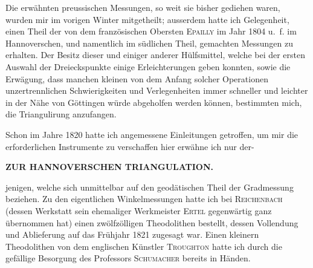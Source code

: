 \par\noindent\hspace*{\parindent}Die erwähnten preussischen Messungen, so weit sie bisher gediehen waren,
wurden mir im vorigen Winter mitgetheilt; ausserdem hatte ich Gelegenheit,
einen Theil der von dem französischen Obersten \textsc{Epailly} im Jahr 1804 u.\ f.
im Hannoverschen, und namentlich im südlichen Theil, gemachten Messungen
zu erhalten. Der Besitz dieser und einiger anderer Hülfsmittel, welche bei
der ersten Auswahl der Dreieckspunkte einige Erleichterungen geben konnten,
sowie die Erwägung, dass manchen kleinen von dem Anfang solcher Operationen
unzertrennlichen Schwierigkeiten und Verlegenheiten immer schneller
und leichter in der Nähe von Göttingen würde abgeholfen werden können,
bestimmten mich, die Triangulirung  anzufangen.

\par\noindent\hspace*{\parindent}Schon im Jahre 1820 hatte ich angemessene Einleitungen getroffen, um
mir die erforderlichen Instrumente zu verschaffen\textperiodcentered{} hier erwähne ich nur der-
\par\clearpage

\noindent\null\hfill{\small\textbf{ZUR HANNOVERSCHEN TRIANGULATION.}}\hfill{}\par\medskip
\noindent jenigen, welche sich unmittelbar auf den geodätischen Theil der Gradmessung
beziehen. Zu den eigentlichen Winkelmessungen hatte ich bei \textsc{Reichenbach}
(dessen Werkstatt sein ehemaliger Werkmeister \textsc{Ertel} gegenwärtig ganz übernommen
hat) einen zwölfzölligen Theodolithen bestellt, dessen Vollendung und
Ablieferung auf das Frühjahr 1821 zugesagt war. Einen kleinern Theodolithen
von dem englischen Künstler \textsc{Troughton} hatte ich durch die gefällige Besorgung
des Professors \textsc{Schumacher} bereits in Händen.

